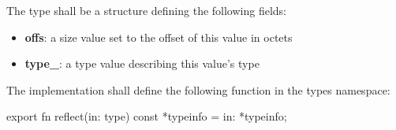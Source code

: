 \specsubsubitem
The  type shall be a structure defining the following
fields:

\begin{itemize}
\item \textbf{offs}: a size value set to the offset of this value in octets
\item \textbf{type\_}: a type value describing this value's type
\end{itemize}


\specsubsubitem
The implementation shall define the following function in the types namespace:

\begin{codesample}
export fn reflect(in: type) const *typeinfo = in: *typeinfo;
\end{codesample}

